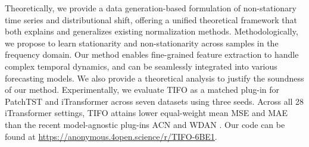 \documentclass[sigconf,anonymous,review]{acmart}
\newcommand{\resubmitchange}[1]{#1}
\newcommand{\methodn}{\textsc{TIFO}}
\newcommand{\method}{\textsc{\methodn}\xspace}
\begin{document}
     Theoretically,
   we provide a data generation-based formulation of non-stationary time series and distributional shift, offering a unified theoretical framework that both explains and generalizes existing normalization methods.
     Methodologically, we propose to learn stationarity and non-stationarity across samples in the frequency domain.
    Our method enables fine-grained feature extraction to handle complex temporal dynamics, and can be seamlessly integrated into various forecasting models.
    We also provide a theoretical analysis to justify the soundness of our method.
   \resubmitchange{ Experimentally, we evaluate \method as a matched plug-in for PatchTST \citep{PatchTST} and iTransformer \citep{liu2023itransformer} across seven datasets using three seeds. Across all 28 iTransformer settings, TIFO attains lower equal-weight mean MSE and MAE than the recent model-agnostic plug-ins ACN \citep{lee2025channel} and WDAN \citep{lin2025wdan}.}
Our code can be found at 
\url{https://anonymous.4open.science/r/TIFO-6BE1}.




\end{document}

